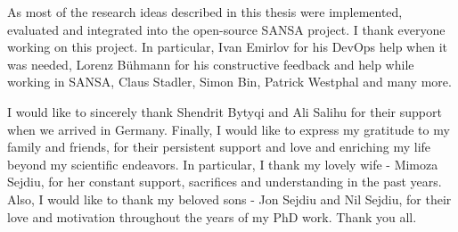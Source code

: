 As most of the research ideas described in this thesis were implemented, evaluated and integrated into the open-source SANSA project.
I thank everyone working on this project.
In particular, Ivan Emirlov for his DevOps help when it was needed, Lorenz B\"uhmann for his constructive feedback and help while working in SANSA, Claus Stadler, Simon Bin, Patrick Westphal and many more.

I would like to sincerely thank Shendrit Bytyqi and Ali Salihu for their support when we arrived in Germany.
Finally, I would like to express my gratitude to my family and friends, for their persistent support and love and enriching my life beyond my scientific endeavors.
In particular, I thank my lovely wife - Mimoza Sejdiu, for her constant support, sacrifices and understanding in the past years.
Also, I would like to thank my beloved sons - Jon Sejdiu and Nil Sejdiu, for their love and motivation throughout the years of my PhD work.
Thank you all.


\thispagestyle{empty}
{\raggedleft\vfill\itshape{}\par
}
